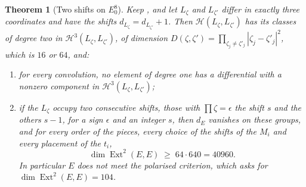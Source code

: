 \documentclass[11pt,reqno]{amsart}
\theoremstyle{plain}
\newtheorem{theorem}{Theorem}[section]
\theoremstyle{definition}
\theoremstyle{remark}
\newcommand{\cH}{\mathcal{H}}
\DeclareMathOperator{\Ext}{Ext}
\begin{document}
\begin{theorem}[Two shifts on $E_{0}^{8}$]\label{thm:efourtwolevels}
Keep , and let $L_{\zeta}$ and $L_{\zeta'}$ differ in
exactly three coordinates and have the shifts $d_{L_{\zeta}}=d_{L_{\zeta'}}+1$.
Then $\cH(L_{\zeta},L_{\zeta'})$ has its classes of degree two in
$\cH^{3}(L_{\zeta},L_{\zeta'})$, of dimension
$D(\zeta,\zeta')=\prod_{\zeta_{j}\ne\zeta'_{j}}|\zeta_{j}-\zeta'_{j}|^{2}$,
which is $16$ or $64$, and:
\begin{enumerate}[label=\textup{(\roman*)},leftmargin=2.6em,itemsep=2pt]
\item for every convolution, no element of degree one has a differential
  with a nonzero component in $\cH^{3}(L_{\zeta},L_{\zeta'})$;
\item if the $L_{\zeta}$ occupy two consecutive shifts, those with
  $\prod\zeta=\epsilon$ the shift $s$ and the others $s-1$, for a sign
  $\epsilon$ and an integer $s$, then $d_{E}$ vanishes on these groups, and
  for every order of the pieces, every choice of the shifts of the $M_{i}$
  and every placement of the $t_{i}$,
  \[
    \dim\Ext^{2}(E,E)\;\ge\;64\cdot640=40960 .
  \]
  In particular $E$ does not meet the polarised criterion, which asks for
  $\dim\Ext^{2}(E,E)=104$.
\end{enumerate}
\end{theorem}
\end{document}
